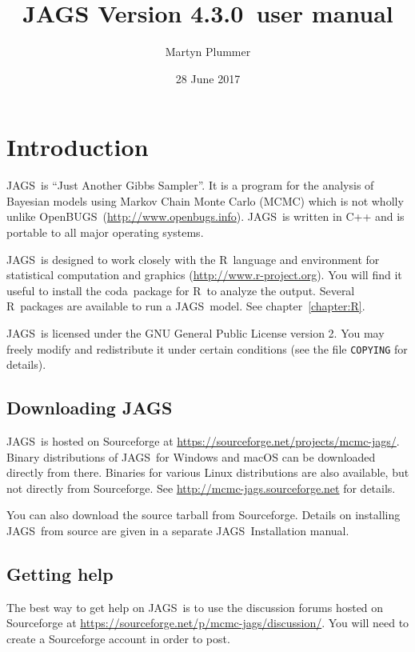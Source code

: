 \documentclass[11pt, a4paper, titlepage]{report}
\newcommand{\release}{4.3.0}
\newcommand{\JAGS}{\textsf{JAGS}}
\newcommand{\OpenBUGS}{\textsf{OpenBUGS}}
\newcommand{\R}{\textsf{R}}
\newcommand{\CODA}{\textsf{coda}}
\begin{document}
\title{JAGS Version \release\ user manual}
\author{Martyn Plummer}
\date{28 June 2017}
\maketitle

\tableofcontents

\chapter{Introduction}

\JAGS\ is ``Just Another Gibbs Sampler''.  It is a program for the
analysis of Bayesian models using Markov Chain Monte Carlo (MCMC)
which is not wholly unlike
\OpenBUGS\ (\url{http://www.openbugs.info}). \JAGS\ is written in
C++ and is portable to all major operating systems. %

\JAGS\ is designed to work closely with the \R\ language and
environment for statistical computation and graphics
(\url{http://www.r-project.org}).  You will find it useful to install
the \CODA\ package for \R\ to analyze the output. Several \R\ packages
are available to run a \JAGS\ model. See chapter~\ref{chapter:R}.

\JAGS\ is licensed under the GNU General Public License version 2. You
may freely modify and redistribute it under certain conditions (see
the file \texttt{COPYING} for details).

\section{Downloading \JAGS}

\JAGS\ is hosted on Sourceforge at
\url{https://sourceforge.net/projects/mcmc-jags/}. Binary
distributions of \JAGS\ for Windows and macOS can be downloaded
directly from there.  Binaries for various Linux distributions are
also available, but not directly from Sourceforge. See
\url{http://mcmc-jags.sourceforge.net} for details.

You can also download the source tarball from Sourceforge. Details
on installing \JAGS\ from source are given in a separate \JAGS\
Installation manual.

\section{Getting help}
\label{section:help}

The best way to get help on \JAGS\ is to use the discussion forums
hosted on Sourceforge at
\url{https://sourceforge.net/p/mcmc-jags/discussion/}.  You will need
to create a Sourceforge account in order to post.
\end{document}
